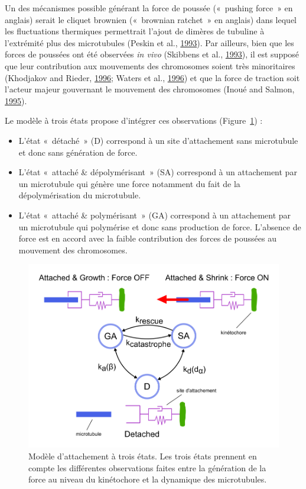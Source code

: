 \documentclass[12pt,a4paper,twoside,openright]{book}
\begin{document}
Un des mécanismes possible générant la force de poussée («~pushing
force~» en anglais) serait le cliquet brownien («~brownian ratchet~» en
anglais) dans lequel les fluctuations thermiques permettrait l'ajout de
dimères de tubuline à l'extrémité plus des microtubules (Peskin et al.,
\protect\hyperlink{ref-Peskin1993}{1993}). Par ailleurs, bien que les
forces de poussées ont été observées \emph{in vivo} (Skibbens et al.,
\protect\hyperlink{ref-Skibbens1993}{1993}), il est supposé que leur
contribution aux mouvements des chromosomes soient très minoritaires
(Khodjakov and Rieder, \protect\hyperlink{ref-Khodjakov1996}{1996};
Waters et al., \protect\hyperlink{ref-Waters1996a}{1996}) et que la
force de traction soit l'acteur majeur gouvernant le mouvement des
chromosomes (Inoué and Salmon, \protect\hyperlink{ref-Inoue1995}{1995}).

Le modèle à trois états propose d'intégrer ces observations
(Figure~\ref{fig:three_states}) :

\begin{itemize}
\item
  L'état «~détaché~» (D) correspond à un site d'attachement sans
  microtubule et donc sans génération de force.
\item
  L'état «~attaché \& dépolymérisant~» (SA) correspond à un attachement
  par un microtubule qui génère une force notamment du fait de la
  dépolymérisation du microtubule.
\item
  L'état «~attaché \& polymérisant~» (GA) correspond à un attachement
  par un microtubule qui polymérise et donc sans production de force.
  L'absence de force est en accord avec la faible contribution des
  forces de poussées au mouvement des chromosomes.
\end{itemize}

\begin{figure}[htbp]
\centering
\includegraphics{figures/results/modelling/three_states.png}
\caption[Modèle d'attachement à trois états]{\label{fig:three_states}Modèle
d'attachement à trois états. Les trois états prennent en compte les
différentes observations faites entre la génération de la force au
niveau du kinétochore et la dynamique des microtubules.}
\end{figure}
\end{document}
